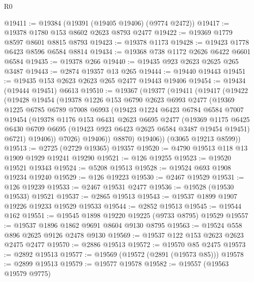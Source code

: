 \begin{lexlean}{R0}
\begin{coremodule}
@19411 := @19384 (@19391 (@19405 @19406) (@9774 @2472))
@19417 := @19378 @1780 @153 @8602 @2623 @8793 @2477
@19422 := @19369 @1779 @8597 @8601 @8815 @8793
@19423 := @19378 @1173
@19428 := @19423 @1778 @6423 @8596 @6584 @8814
@19434 := @19368 @738 @1172 @2626 @6422 @6601 @6584
@19435 := @19378 @266
@19440 := @19435 @923 @2623 @2625 @265 @3487
@19443 := @2874 @19357 @13 @265
@19444 := @19440 @19443
@19451 := @19435 @153 @2623 @2623 @265 @2477 @19443 @19406
@19454 := @19434 (@19444 @19451) @6613
@19510 := @19367
    (@19377
      (@19411
        (@19417
          (@19422
            (@19428
              @19454
              (@19378
                @1226
                @153
                @6790
                @2623
                @6993
                @2477
                (@19369
                  @1225
                  @6785
                  @6789
                  @7008
                  @6993
                  (@19423
                    @1224
                    @6423
                    @6784
                    @6584
                    @7007
                    @19454
                    (@19378
                      @1176
                      @153
                      @6431
                      @2623
                      @6695
                      @2477
                      (@19369
                        @1175
                        @6425
                        @6430
                        @6709
                        @6695
                        (@19423 @923 @6423 @2625 @6584 @3487 @19454 @19451)
                        @6721)
                      @19406))
                  @7026)
                @19406))
            @8870)
          @19406))
      (@3065 @19213 @8599))
@19513 := @2725 (@2729 @19365) @19357
@19520 := @4790 @19513 @118 @13 @1909 @1929 @19241 @19290
@19521 := @126 @19255
@19523 := @19520 @19521 @19343
@19524 := @5208 @19513
@19528 := @19524 @693 @1908 @19234 @19240
@19529 := @126 @19223
@19530 := @2467 @19529
@19531 := @126 @19239
@19533 := @2467 @19531 @2477
@19536 := @19528 (@19530 @19533) @19521
@19537 := @2865 @19513
@19543 := @19537 @1899 @1907 @19226 @19233 @19529 @19533
@19544 := @2852 @19513
@19545 := @19544 @162
@19551 := @19545 @1898 @19220 @19225 (@9733 @8795) @19529
@19557 := @19537 @1896 @1862 @9691 @8604 @9130 @8795
@19563 := @19524 @558 @896 @2625 @9126 @2478 @9130
@19569 := @19537 @122 @153 @2623 @2623 @2475 @2477
@19570 := @2886 @19513
@19572 := @19570 @85 @2475
@19573 := @2892 @19513
@19577 := @19569 (@19572 (@2891 (@19573 @85)))
@19578 := @2899 @19513
@19579 := @19577 @19578
@19582 := @19557 (@19563 @19579 @9775)

\end{coremodule}
\end{lexlean}
